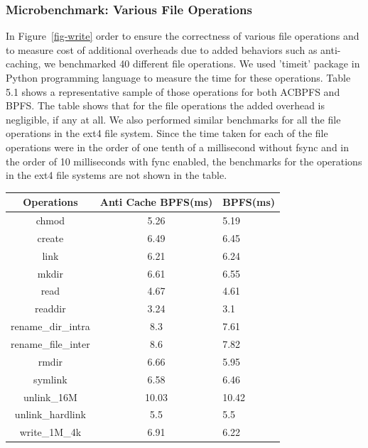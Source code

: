 \subsubsection{Microbenchmark: Various File Operations}
In Figure~\ref{fig-write} order to ensure the correctness of various file operations and to measure cost of additional overheads due to added behaviors such as anti-caching, we benchmarked 40 different file operations. We used 'timeit' package in Python programming language to measure the time for these operations. Table 5.1 shows a representative sample of those operations for both AC\-BPFS and BPFS. The table shows that for the file operations the added overhead is negligible, if any at all. We also performed similar benchmarks for all the file operations in the ext4 file system. Since the time taken for each of the file operations were in the order of one tenth of a millisecond without fsync and in the order of 10 milliseconds with fync enabled, the benchmarks for the operations in the ext4 file systems are not shown in the table.

\begin{table}[!t]
\begin{center}
{\footnotesize
\begin{tabular}{c|c|l}
\textbf{Operations} & \textbf{Anti Cache BPFS(ms)} & \textbf{BPFS(ms)} \\
\hline
chmod&5.26&5.19 \\
create&6.49&6.45 \\
link&6.21&6.24 \\
mkdir&6.61&6.55 \\
read&4.67&4.61 \\
readdir&3.24&3.1 \\
rename\_dir\_intra&8.3&7.61 \\
rename\_file\_inter&8.6&7.82 \\
rmdir&6.66&5.95 \\
symlink&6.58&6.46 \\
unlink\_16M&10.03&10.42 \\
unlink\_hardlink&5.5&5.5 \\
write\_1M\_4k&6.91&6.22 \\

\end{tabular}
}
\end{center}
\vspace{-0.1in}
\end{table}

